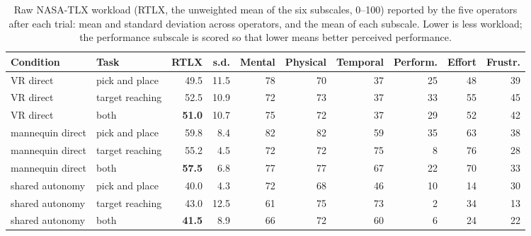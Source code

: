 \begin{table}[htbp]
  \centering
  \footnotesize
  \caption[NASA-TLX workload by condition and task]{Raw NASA-TLX workload
  (RTLX, the unweighted mean of the six subscales, 0--100) reported by the
  five operators after each trial: mean and standard deviation across
  operators, and the mean of each subscale. Lower is less workload; the
  performance subscale is scored so that lower means better perceived
  performance.}
  \label{tab:tlx}
  \begin{tabular}{p{2.9cm}p{2.3cm}rrrrrrrr}
    \toprule
    Condition & Task & RTLX & s.d. & Mental & Physical & Temporal & Perform. & Effort & Frustr. \\
    \midrule
    VR direct & pick and place & 49.5 & 11.5 & 78 & 70 & 37 & 25 & 48 & 39 \\
    VR direct & target reaching & 52.5 & 10.9 & 72 & 73 & 37 & 33 & 55 & 45 \\
    VR direct & both & \textbf{51.0} & 10.7 & 75 & 72 & 37 & 29 & 52 & 42 \\
    \addlinespace
    mannequin direct & pick and place & 59.8 & 8.4 & 82 & 82 & 59 & 35 & 63 & 38 \\
    mannequin direct & target reaching & 55.2 & 4.5 & 72 & 72 & 75 & 8 & 76 & 28 \\
    mannequin direct & both & \textbf{57.5} & 6.8 & 77 & 77 & 67 & 22 & 70 & 33 \\
    \addlinespace
    shared autonomy & pick and place & 40.0 & 4.3 & 72 & 68 & 46 & 10 & 14 & 30 \\
    shared autonomy & target reaching & 43.0 & 12.5 & 61 & 75 & 73 & 2 & 34 & 13 \\
    shared autonomy & both & \textbf{41.5} & 8.9 & 66 & 72 & 60 & 6 & 24 & 22 \\
    \bottomrule
  \end{tabular}
\end{table}
